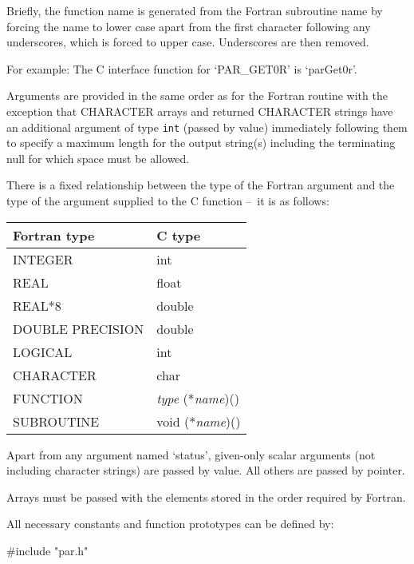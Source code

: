 \documentclass[twoside,11pt,nolof]{starlink}
\providecommand{\dash}{--}
\begin{document}
Briefly, the function name is generated from the Fortran subroutine name by
forcing the name to lower case apart from the first character following any
underscores, which is forced to upper case. Underscores are then removed.

For example: The C interface function for `PAR\_GET0R' is `parGet0r'.

Arguments are provided in the same order as for the Fortran routine with the
exception that CHARACTER arrays and returned CHARACTER strings
have an additional argument of type \texttt{int} (passed by value) immediately
following them to specify a maximum length for the output string(s) including
the terminating null for which space must be allowed.

There is a fixed relationship between the type of the Fortran
argument and the type of the argument supplied to the C function \dash\ it is
as follows:
\begin{center}
\begin{tabular}{|l|l|}
\hline
Fortran type & C type \\
\hline
INTEGER & int \\
REAL & float \\
REAL*8 & double \\
DOUBLE PRECISION & double \\
LOGICAL & int \\
CHARACTER & char \\
FUNCTION & \textit{type} (*\textit{name})() \\
SUBROUTINE & void (*\textit{name})() \\
\hline
\end{tabular}
\end{center}

Apart from any argument named `status', given-only scalar arguments (not
including character strings) are passed by value.
All others are passed by pointer.

Arrays must be passed with the elements stored in the order required by Fortran.

All necessary constants and function prototypes can be defined by:
\begin{terminalv}
#include "par.h"
\end{terminalv}
\end{document}
